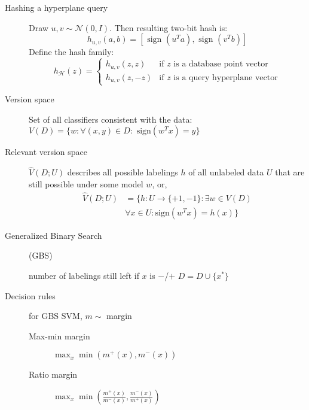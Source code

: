 \documentclass[11pt,landscape]{article}
\begin{document}
\begin{multicols}{3}
\begin{description}
    \item[Hashing a hyperplane query] Draw $u,v \sim \mathcal{N}(0,I)$. Then resulting two-bit hash is:
    $$ h_{u,v}(a,b) = \left [ \text{ sign }(u^T a),\text{ sign }(v^T b) \right ]$$
    Define the hash family:
    $$
    h_{\mathcal{H}}(z) = \begin{cases}
        h_{u,v} (z,z) & \text{if $z$ is a database point vector} \\
        h_{u,v} (z,-z) & \text{if $z$ is a query hyperplane vector}
    \end{cases}$$
    \item[Version space] Set of all classifiers consistent with the data:
        $V(D) = \{w : \forall (x,y) \in D : \text{ sign}(w^T x) = y \}$
    \item[Relevant version space] $\hat{V}(D;U)$ describes all possible labelings $h$ of all unlabeled data $U$ that are still possible under some model $w$, or,
    \begin{align*}
        \hat{V}(D;U) &= \{h: U \rightarrow  \{+1,-1\}  : \exists w  \in V(D)\\
        &\forall x \in U : \text{sign}(w^T x) = h(x) \}
    \end{align*}
\item[Generalized Binary Search] (GBS)\\
    \begin{algorithmic}[1]
                \State \Comment number of labelings still left if $x$ is $-$/$+$
            \EndFor
            \State $D = D \cup \{x^\ast\}$
        \EndWhile
    \end{algorithmic}
\item[Decision rules] for GBS SVM, $m \sim$ margin\\
    \begin{description}
        \item[Max-min margin] $\max_x \min \left( m^+(x),m^-(x) \right)$
        \item[Ratio margin] $\max_x \min \left (\frac{m^+(x)}{m^-(x)},\frac{m^-(x)}{m^+(x)} \right)$
    \end{description}
\end{description}


\end{multicols}
\end{document}
